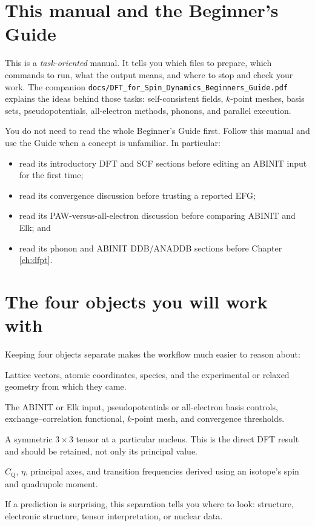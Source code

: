 \documentclass[11pt,oneside]{report}
\newcommand{\code}[1]{{\small\nolinkurl{#1}}}
\newcommand{\Cq}{C_{\mathrm{Q}}}
\begin{document}
\section{This manual and the Beginner's Guide}

This is a \emph{task-oriented} manual. It tells you which files to prepare,
which commands to run, what the output means, and where to stop and check your
work. The companion
\code{docs/DFT\_for\_Spin\_Dynamics\_Beginners\_Guide.pdf} explains the ideas
behind those tasks: self-consistent fields, $k$-point meshes, basis sets,
pseudopotentials, all-electron methods, phonons, and parallel execution.

You do not need to read the whole Beginner's Guide first. Follow this manual and
use the Guide when a concept is unfamiliar. In particular:
\begin{itemize}
  \item read its introductory DFT and SCF sections before editing an ABINIT
    input for the first time;
  \item read its convergence discussion before trusting a reported EFG;
  \item read its PAW-versus-all-electron discussion before comparing ABINIT and
    Elk; and
  \item read its phonon and ABINIT DDB/ANADDB sections before Chapter
    \ref{ch:dfpt}.
\end{itemize}

\section{The four objects you will work with}

Keeping four objects separate makes the workflow much easier to reason about:
\begin{description}[style=nextline]
  \item[Structure]
  Lattice vectors, atomic coordinates, species, and the experimental or
  relaxed geometry from which they came.
  \item[Electronic-structure calculation]
  The ABINIT or Elk input, pseudopotentials or all-electron basis controls,
  exchange--correlation functional, $k$-point mesh, and convergence thresholds.
  \item[EFG tensor]
  A symmetric $3\times3$ tensor at a particular nucleus. This is the direct DFT
  result and should be retained, not only its principal value.
  \item[Magnetic-resonance observables]
  $\Cq$, $\eta$, principal axes, and transition frequencies derived using an
  isotope's spin and quadrupole moment.
\end{description}
If a prediction is surprising, this separation tells you where to look:
structure, electronic structure, tensor interpretation, or nuclear data.
\end{document}
